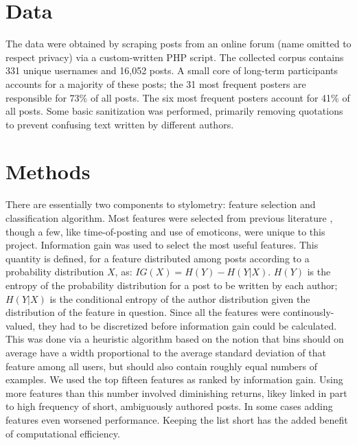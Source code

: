 \documentclass[12pt,letterpaper,onecolumn,oneside]{article}
\numberwithin{equation}{section}
\numberwithin{figure}{section}
\begin{document}
\section{Data}
The data were obtained by scraping posts from an online forum (name omitted to respect privacy) via a custom-written PHP script. The collected corpus contains 331 unique usernames and 16,052 posts. A small core of 
long-term participants accounts for a majority of these posts; the 31 most frequent posters are responsible for 73\% of all posts. The six most frequent posters account for 41\% of all posts. Some basic 
sanitization was performed, primarily removing quotations to prevent confusing text written by different authors.

\section{Methods}
There are essentially two components to stylometry: feature selection and classification algorithm. Most features were selected from previous literature \cite{anonymouth,stanford}, though a few, like 
time-of-posting and use of emoticons, were unique to this project. Information gain was used to select the most useful features. This quantity is defined, for a feature distributed among posts according to a 
probability distribution \(X\), as: \(IG(X) = H(Y) - H(Y|X)\). \(H(Y)\) is the entropy of the probability distribution for a post to be written by each author; \(H(Y|X)\) is the conditional entropy of the author 
distribution given the distribution of the feature in question. Since all the features were continously-valued, they had to be discretized before information gain could be calculated. This was done via a heuristic 
algorithm based on the notion that bins should on average have a width proportional to the average standard deviation of that feature among all users, but should also contain roughly equal numbers of examples. We 
used the top fifteen features as ranked by information gain. Using more features than this number involved diminishing returns, likey linked in part to high frequency of short, ambiguously authored posts. In some 
cases adding features even worsened performance. Keeping the list short has the added benefit of computational efficiency.
\end{document}
